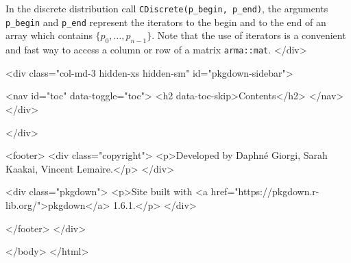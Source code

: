 In the discrete distribution call \texttt{CDiscrete(p\_begin,\ p\_end)}, the arguments \texttt{p\_begin} and \texttt{p\_end} represent the iterators to the begin and to the end of an array which contains \(\{p_0, \dots, p_{n-1}\}\). Note that the use of iterators is a convenient and fast way to access a column or row of a matrix \texttt{arma::mat}.
  </div>

  <div class="col-md-3 hidden-xs hidden-sm" id="pkgdown-sidebar">

        <nav id="toc" data-toggle="toc">
      <h2 data-toc-skip>Contents</h2>
    </nav>
      </div>

</div>



      <footer>
      <div class="copyright">
  <p>Developed by Daphné Giorgi, Sarah Kaakai, Vincent Lemaire.</p>
</div>

<div class="pkgdown">
  <p>Site built with <a href="https://pkgdown.r-lib.org/">pkgdown</a> 1.6.1.</p>
</div>

      </footer>
   </div>

  


  </body>
</html>

